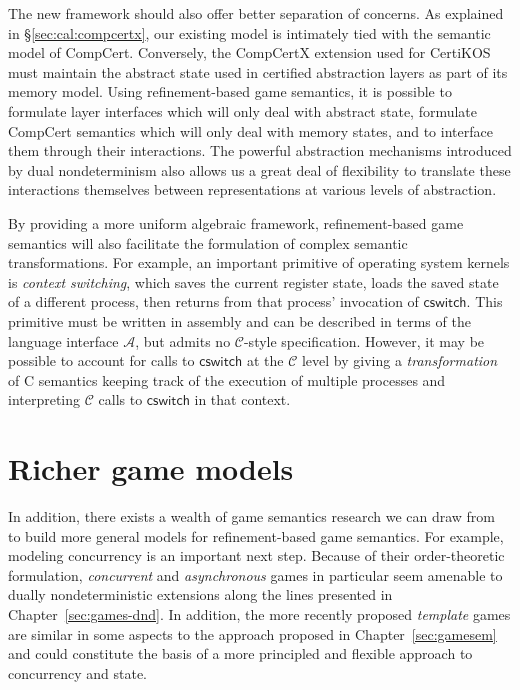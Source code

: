 \documentclass[11pt,oneside]{book}
\theoremstyle{definition}
\newcommand{\kw}[1]{\ensuremath{ \mathsf{#1} }}
\begin{document}
The new framework should also offer
better separation of concerns.
As explained in \S\ref{sec:cal:compcertx},
our existing model
is intimately tied with the semantic model of CompCert.
Conversely,
the CompCertX extension used for CertiKOS
must maintain the abstract state used in certified abstraction layers
as part of its memory model.
Using refinement-based game semantics,
it is possible to formulate layer interfaces
which will only deal with abstract state,
formulate CompCert semantics which will only deal
with memory states,
and to interface them through their interactions.
The powerful abstraction mechanisms
introduced by dual nondeterminism
also allows us a great deal of flexibility
to translate these interactions themselves
between representations at various levels of abstraction.

By providing a more uniform algebraic framework,
refinement-based game semantics will also facilitate
the formulation of complex semantic transformations.
For example,
an important primitive of operating system kernels
is \emph{context switching},
which saves the current register state,
loads the saved state of a different process,
then returns from that process' invocation of \kw{cswitch}.
This primitive must be written in assembly
and can be described in terms of the language interface $\mathcal{A}$,
but admits no $\mathcal{C}$-style specification.
However,
it may be possible to account for calls to \kw{cswitch}
at the $\mathcal{C}$ level
by giving a \emph{transformation} of C semantics
keeping track of the execution of multiple processes
and interpreting $\mathcal{C}$ calls to \kw{cswitch}
in that context.


\section{Richer game models} %

In addition,
there exists a wealth of game semantics research
we can draw from to build
more general models for refinement-based game semantics.
For example,
modeling concurrency is an important next step.
Because of their order-theoretic formulation,
\emph{concurrent} and \emph{asynchronous} games \citep{cgames,agames2}
in particular seem amenable to dually nondeterministic extensions
along the lines presented in Chapter~\ref{sec:games-dnd}.
In addition,
the more recently proposed
\emph{template} games \citep{tgames}
are similar in some aspects
to the approach proposed in Chapter~\ref{sec:gamesem}
and could constitute the basis of
a more principled and flexible approach
to concurrency and state.
\end{document}
